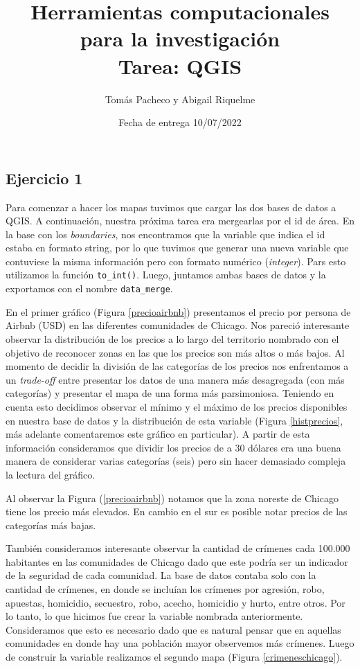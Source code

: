\documentclass[12pt]{article}
\title{ %
Herramientas computacionales para la investigaci\'on \\
\vspace{0.3cm}
\textbf{Tarea: QGIS }}
\author{Tom\'as Pacheco y Abigail Riquelme}
\date{Fecha de entrega 10/07/2022}
\begin{document}
\maketitle
\onehalfspace





\subsection*{Ejercicio 1}

Para comenzar a hacer los mapas tuvimos que cargar las dos bases de datos a QGIS. A continuación, nuestra próxima tarea era mergearlas por el id de área. En la base con los \textit{boundaries}, nos encontramos que la variable que indica el id estaba en formato string, por lo que tuvimos que generar una nueva variable que contuviese la misma información pero con formato numérico (\textit{integer}). Pars esto utilizamos la función \texttt{to\_int()}. Luego, juntamos ambas bases de datos y la exportamos con el nombre \texttt{data\_merge}.

En el primer gráfico (Figura \ref{precioairbnb}) presentamos el precio por persona de Airbnb (USD) en las diferentes comunidades de Chicago. Nos pareció interesante observar la distribución de los precios a lo largo del territorio nombrado con el objetivo de reconocer zonas en las que los precios son más altos o más bajos. Al momento de decidir la división de las categorías de los precios nos enfrentamos a un \textit{trade-off} entre presentar los datos de una manera más desagregada (con más categorías) y presentar el mapa de una forma más parsimoniosa. Teniendo en cuenta esto decidimos observar el mínimo y el máximo de los precios disponibles en nuestra base de datos y la distribución de esta variable (Figura \ref{histprecios}, más adelante comentaremos este gráfico en particular). A partir de esta información consideramos que dividir los precios de a 30 dólares era una buena manera de considerar varias categorías (seis) pero sin hacer demasiado compleja la lectura del gráfico. 

Al observar la Figura (\ref{precioairbnb}) notamos que la zona noreste de Chicago tiene los precio más elevados. En cambio en el sur es posible notar precios de las categorías más bajas. 


También consideramos interesante observar la cantidad de crímenes cada 100.000 habitantes en las comunidades de Chicago dado que este podría ser un indicador de la seguridad de cada comunidad. La base de datos contaba solo con la cantidad de crímenes, en donde se incluían los crímenes por agresión, robo, apuestas, homicidio, secuestro, robo, acecho, homicidio y hurto, entre otros. Por lo tanto, lo que hicimos fue crear la variable nombrada anteriormente. Consideramos que esto es necesario dado que es natural pensar que en aquellas comunidades en donde hay una población mayor observemos más crímenes. Luego de construir la variable realizamos el segundo mapa (Figura \ref{crimeneschicago}). 
\end{document}
